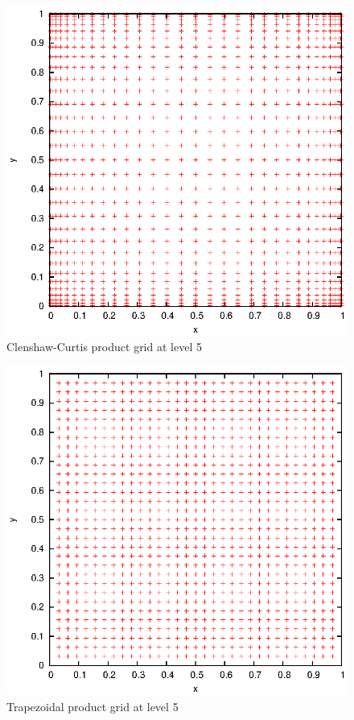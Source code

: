 \documentclass[]{article}
\begin{document}
\begin{figure}[!ht]
\centering
\includegraphics[width=.9\textwidth]{task9_cc}
\caption{Clenshaw-Curtis product grid at level 5}
\label{fig:Task9b}
\end{figure}

\begin{figure}[!ht]
\centering
\includegraphics[width=.9\textwidth]{task9_trapezoidal}
\caption{Trapezoidal product grid at level 5}
\label{fig:Task9c}
\end{figure}
\clearpage
\end{document}
